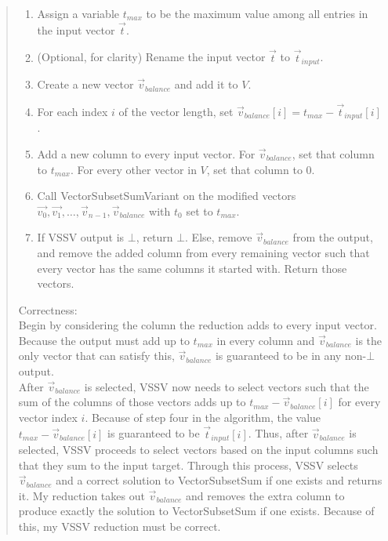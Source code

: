 \documentclass[11pt]{article}
\begin{document}
\begin{quote}
    \begin{enumerate}
        \item Assign a variable $t_{max}$ to be the maximum value among all entries in the input vector $\Vec{t}$.
        \item (Optional, for clarity) Rename the input vector $\Vec{t}$ to $\Vec{t}_{input}$.
        \item Create a new vector $\Vec{v}_{balance}$ and add it to $V$. 
        \item For each index $i$ of the vector length, set $\Vec{v}_{balance}[i] = t_{max} - \Vec{t}_{input}[i]$. 
        \item Add a new column to every input vector. For $\Vec{v}_{balance}$, set that column to $t_{max}$. For every other vector in $V$, set that column to $0$.
        \item Call VectorSubsetSumVariant on the modified vectors $\Vec{v_0}, \Vec{v_1}, \dots, \Vec{v}_{n - 1}, \Vec{v}_{balance}$ with $t_0$ set to $t_{max}$.
        \item If VSSV output is $\bot$, return $\bot$. Else, remove $\Vec{v}_{balance}$ from the output, and remove the added column from every remaining vector such that every vector has the same columns it started with. Return those vectors.
    \end{enumerate}

    Correctness: \\
    Begin by considering the column the reduction adds to every input vector. Because the output must add up to $t_{max}$ in every column and $\Vec{v}_{balance}$ is the only vector that can satisfy this, $\Vec{v}_{balance}$ is guaranteed to be in any non-$\bot$ output. \\

    After $\Vec{v}_{balance}$ is selected, VSSV now needs to select vectors such that the sum of the columns of those vectors adds up to $t_{max} - \Vec{v}_{balance}[i]$ for every vector index $i$. Because of step four in the algorithm, the value $t_{max} - \Vec{v}_{balance}[i]$ is guaranteed to be $\Vec{t}_{input}[i]$. Thus, after $\Vec{v}_{balance}$ is selected, VSSV proceeds to select vectors based on the input columns such that they sum to the input target. Through this process, VSSV selects $\Vec{v}_{balance}$ and a correct solution to VectorSubsetSum if one exists and returns it. My reduction takes out $\Vec{v}_{balance}$ and removes the extra column to produce exactly the solution to VectorSubsetSum if one exists. Because of this, my VSSV reduction must be correct. \\


\end{quote}
\end{document}
